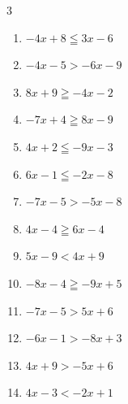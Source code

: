 \begin{multicols}{3}
\begin{enumerate}
  \item $-4x+8\leqq 3x-6$

        \phantom{$\displaystyle x\geqq 2$}

  \item $-4x-5>-6x-9$

        \phantom{$\displaystyle x>-2$}

  \item $8x+9\geqq -4x-2$


  \item $-7x+4\geqq 8x-9$


  \item $4x+2\leqq -9x-3$


  \item $6x-1\leqq -2x-8$


  \item $-7x-5>-5x-8$


\columnbreak %

  \item $4x-4\geqq 6x-4$

        \phantom{$\displaystyle x\leqq 0$}

  \item $5x-9<4x+9$

        \phantom{$\displaystyle x<18$}

  \item $-8x-4\geqq -9x+5$

        \phantom{$\displaystyle x\geqq 9$}

  \item $-7x-5>5x+6$


  \item $-6x-1>-8x+3$

        \phantom{$\displaystyle x>2$}

  \item $4x+9>-5x+6$


  \item $4x-3<-2x+1$


\end{enumerate}
\end{multicols}
